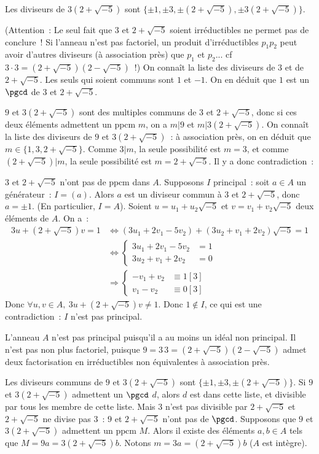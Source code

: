 {\begin{enumerate}
{Les diviseurs de $3(2+\sqrt{-5})$ sont
$\{\pm1,\pm3,\pm(2+\sqrt{-5}),\pm3(2+\sqrt{-5})\}$.

(Attention~: Le seul fait que $3$ et $2+\sqrt{-5}$ soient irréductibles
ne permet pas de conclure~! Si l'anneau n'est pas factoriel, un produit
d'irréductibles $p_{1}p_{2}$ peut avoir d'autres diviseurs (à association
près) que $p_{1}$ et $p_{2}$... cf $3\cdot3=(2+\sqrt{-5})(2-\sqrt{-5})$~!)
On connaît la liste des diviseurs de $3$ et de $2+\sqrt{-5}$. Les seuls
qui soient communs sont $1$ et $-1$. On en déduit que $1$ est un $\pgcd$
de $3$ et $2+\sqrt{-5}$. 

\medskip

$9$ et $3(2+\sqrt{-5})$ sont des multiples communs de $3$ et
$2+\sqrt{-5}$, donc si ces deux éléments admettent un $\mathrm{ppcm}$ $m$, on a
$m|9$ et $m|3(2+\sqrt{-5})$. On connaît la liste des diviseurs de $9$ et
$3(2+\sqrt{-5})$~: à association près, on en déduit que
$m\in\{1,3,2+\sqrt{-5}\}$. Comme $3|m$, la seule possibilité est $m=3$,
et comme $(2+\sqrt{-5})|m$, la seule possibilité est $m=2+\sqrt{-5}$. Il
y a donc contradiction~:

$3$ et $2+\sqrt{-5}$ n'ont pas de $\mathrm{ppcm}$ dans $A$.
Supposons $I$ principal~: soit $a\in A$ un générateur~: $I=(a)$. Alors
$a$ est un diviseur commun à $3$ et $2+\sqrt{-5}$, donc $a=\pm1$. (En
particulier, $I=A$). Soient $u=u_{1}+u_{2}\sqrt{-5}$ et
$v=v_{1}+v_{2}\sqrt{-5}$ deux éléments de $A$. On a~:
\begin{align*}
3u+(2+\sqrt{-5})v=1
&\Leftrightarrow (3u_{1}+2v_{1}-5v_{2})+(3u_{2}+v_{1}+2v_{2})\sqrt{-5}=1\\
&\Leftrightarrow \left\{
\begin{array}{rl}
3u_{1}+2v_{1}-5v_{2}&=1\\
3u_{2}+v_{1}+2v_{2}&=0
\end{array}\right.\\
&\Rightarrow \left\{
\begin{array}{rl}
-v_{1}+v_{2}&\equiv1 [3]\\
v_{1}-v_{2}&\equiv0 [3]
\end{array}\right.
\end{align*}
Donc $\forall u,v\in A,\ 3u+(2+\sqrt{-5})v\neq 1$. Donc $1\notin I$, ce
qui est une contradiction~: $I$ n'est pas principal.

L'anneau $A$ n'est pas principal puisqu'il a au moins un idéal non
principal. Il n'est pas non plus factoriel, puisque
$9=3\,3=(2+\sqrt{-5})(2-\sqrt{-5})$ admet deux factorisation en
irréductibles non équivalentes à association près.
\begin{itemize}
Les diviseurs communs de $9$ et $3(2+\sqrt{-5})$ sont $\{\pm1,\pm 3,
\pm(2+\sqrt{-5})\}$. Si $9$ et $3(2+\sqrt{-5})$ admettent un $\pgcd$ $d$,
alors $d$ est dans cette liste, et divisible par tous les membre de cette
liste. Mais $3$ n'est pas divisible par $2+\sqrt{-5}$ et $2+\sqrt{-5}$ ne
divise pas $3$~: $9$ et $2+\sqrt{-5}$ n'ont pas de $\pgcd$.
Supposons que $9$ et $3(2+\sqrt{-5})$ admettent un $\mathrm{ppcm}$ $M$. Alors il
existe des éléments $a,b\in A$ tels que $M=9a=3(2+\sqrt{-5})b$. Notons
$m=3a=(2+\sqrt{-5})b$ ($A$ est intègre).


\end{itemize}}
\end{enumerate}}
